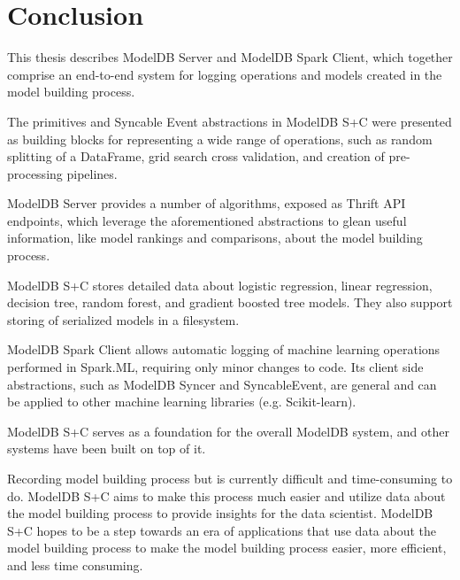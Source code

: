 \chapter{Conclusion}
This thesis describes ModelDB Server and ModelDB Spark Client, which together
comprise an end-to-end system for logging operations and models created in
the model building process.

The primitives and Syncable Event abstractions in ModelDB S+C were presented as
building blocks for representing a wide range of operations, such as random splitting
of a DataFrame, grid search cross validation, and creation of pre-processing pipelines.

ModelDB Server provides a number of algorithms, exposed as Thrift API endpoints, which
leverage the aforementioned abstractions to glean useful information, like model rankings and comparisons,
about the model building process. 

ModelDB S+C stores detailed data about logistic regression, linear regression,
decision tree, random forest, and gradient boosted tree models. They also support storing
of serialized models in a filesystem.

ModelDB Spark Client allows automatic logging of machine learning operations performed in Spark.ML,
requiring only minor changes to code. Its client side abstractions, such as ModelDB Syncer and SyncableEvent, 
are general and can be applied to other machine learning libraries (e.g. Scikit-learn).

ModelDB S+C serves as a foundation for the overall ModelDB system, and other systems have been
built on top of it.

Recording model building process but is currently difficult and time-consuming to do. 
ModelDB S+C aims to make this process much easier and utilize
data about the model building process to provide insights for the data scientist.
ModelDB S+C hopes to be a step towards an era of applications that use data about the model
building process to make the model building process easier, more efficient, and less time consuming.
